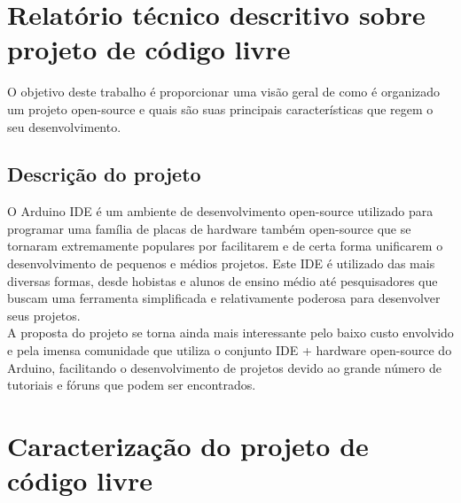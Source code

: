 \documentclass[12pt,a4paper]{article} %
\newcommand\BackgroundStructure{ %
\setlength{\unitlength}{1mm} %

\setlength\fboxsep{0mm} %
\setlength\fboxrule{0.5mm} %
\put(10, 20pr){\fcolorbox{black}{gray!5}{\framebox(155,247){}}} %
\put(165, 20){\fcolorbox{black}{gray!10}{\framebox(37,247){}}} %
\put(10, 262){\fcolorbox{black}{white!10}{\framebox(192, 25){}}} %
\put(175, 263){\texttt{[image: ]}} %
}
\begin{document}


\section{Relat\'orio t\'ecnico descritivo sobre projeto de código livre} 



O objetivo deste trabalho é proporcionar uma visão geral de como é organizado um projeto open-source e quais são suas principais características que regem o seu desenvolvimento.

\subsection{Descrição do projeto}


O Arduino IDE é um ambiente de desenvolvimento open-source utilizado para programar uma família de placas de hardware também open-source que se tornaram extremamente populares por facilitarem e de certa forma unificarem o desenvolvimento de pequenos e médios projetos. Este IDE é utilizado das mais diversas formas, desde hobistas e alunos de ensino médio até pesquisadores que buscam uma ferramenta simplificada e relativamente poderosa para desenvolver seus projetos.
\\

A proposta do projeto se torna ainda mais interessante pelo baixo custo envolvido e pela imensa comunidade que utiliza o conjunto IDE + hardware open-source do Arduino, facilitando o desenvolvimento de projetos devido ao grande número de tutoriais e fóruns que podem ser encontrados. 



\section{Caracterização do projeto de código livre} 
\end{document}
